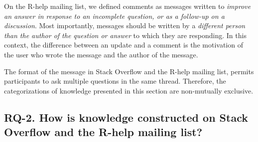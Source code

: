 	On the R-help mailing list, we defined comments as messages written to \emph{improve an answer in response to an incomplete question, or as a follow-up on a discussion}.
	Most importantly, messages should be written by a \emph{different person than the author of the question or answer} to which they are responding.
	In this context, the difference between an update and a comment is the motivation of the user who wrote the message and the author of the message.




	The format of the message in Stack Overflow and the R-help mailing list, permits participants to ask multiple questions in the same thread.
	Therefore, the categorizations of knowledge presented in this section are non-mutually exclusive.

\subsection{RQ-2. How is knowledge constructed on Stack Overflow and the R-help mailing list?}
\label{sec:rq2}

